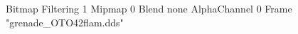 {Bitmap
	{Filtering 1}
	{Mipmap 0}
	{Blend none}
	{AlphaChannel 0}
	{Frame "grenade_OTO42flam.dds"}
}
